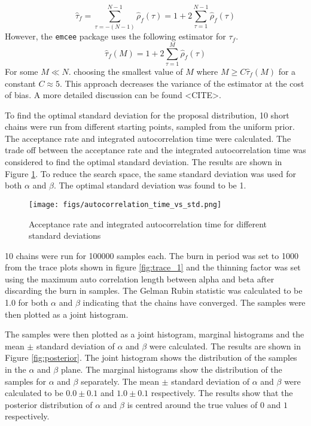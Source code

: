 \documentclass[11pt]{article}
\begin{document}
\begin{equation}
\hat{\tau}_f = \sum_{\tau=-(N-1)}^{N-1} \hat{\rho}_f(\tau) = 1 + 2 \sum_{\tau=1}^{N-1} \hat{\rho}_f(\tau)
\end{equation}
However, the \texttt{emcee} package uses the following estimator for \(\tau_f\). 
\begin{equation}
\hat{\tau}_f(M) = 1 + 2 \sum_{\tau=1}^{M} \hat{\rho}_f(\tau)
\end{equation}
For some \(M \ll N\).  choosing the smallest value of \(M\) where \(M \ge C \hat{\tau}_f(M)\) for a constant \(C \approx 5\). This approach decreases the variance of the estimator at the cost of bias. A more detailed discussion can be found <CITE>.

To find the optimal standard deviation for the proposal distribution, 10 short chains were run from different starting points, sampled from the uniform prior. The acceptance rate and integrated autocorrelation time were calculated. The trade off between the acceptance rate and the integrated autocorrelation time was considered to find the optimal standard deviation. The results are shown in Figure \ref{fig:std_tuning}. To reduce the search space, the same standard deviation was used for both $\alpha$ and $\beta$.
The optimal standard deviation was found to be 1.
\begin{figure}[H]
    \centering
    \texttt{[image: figs/autocorrelation\_time\_vs\_std.png]}
    \caption{Acceptance rate and integrated autocorrelation time for different standard deviations}
    \label{fig:std_tuning}
\end{figure}

10 chains were run for 100000 samples each. The burn in period was set to 1000 from the trace plots shown in figure \ref{fig:trace_1} and the thinning factor was set using the maximum auto correlation length between alpha and beta after discarding the burn in samples. The Gelman Rubin statistic \cite{GelmanRubin1992} was calculated to be 1.0 for both $\alpha$ and $\beta$ indicating that the chains have converged. The samples were then plotted as a joint histogram. 

The samples were then plotted as a joint histogram, marginal histograms and the mean $\pm$ standard deviation of $\alpha$ and $\beta$ were calculated. The results are shown in Figure \ref{fig:posterior}. The joint histogram shows the distribution of the samples in the $\alpha$ and $\beta$ plane. The marginal histograms show the distribution of the samples for $\alpha$ and $\beta$ separately. The mean $\pm$ standard deviation of $\alpha$ and $\beta$ were calculated to be $0.0 \pm 0.1$ and $1.0 \pm 0.1$ respectively. The results show that the posterior distribution of $\alpha$ and $\beta$ is centred around the true values of $0$ and $1$ respectively.

\end{document}
